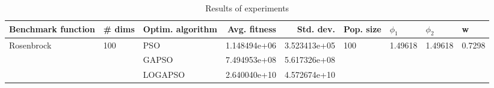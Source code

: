 \begin{table}
\centering
\caption{Results of experiments}
\begin{tabular}{lllrrllll}
\toprule
         Benchmark function &              \# dims & Optim. algorithm &  Avg. fitness &    Std. dev. &            Pop. size &               $\phi_{1}$ &               $\phi_{2}$ &                       w \\
\midrule
\multirow{3}{*}{Rosenbrock} & \multirow{3}{*}{100} &              PSO &  1.148494e+06 & 3.523413e+05 & \multirow{3}{*}{100} & \multirow{3}{*}{1.49618} & \multirow{3}{*}{1.49618} & \multirow{3}{*}{0.7298} \\
                            &                      &            GAPSO &  7.494953e+08 & 5.617326e+08 &                      &                          &                          &                         \\
                            &                      &          LOGAPSO &  2.640040e+10 & 4.572674e+10 &                      &                          &                          &                         \\
\bottomrule
\end{tabular}
\end{table}
